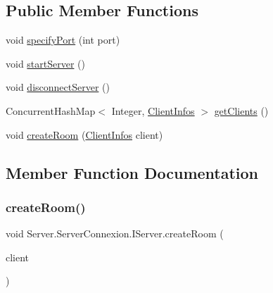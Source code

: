 \subsection*{Public Member Functions}
\begin{DoxyCompactItemize}
\item 
void \mbox{\hyperlink{interfaceServer_1_1ServerConnexion_1_1IServer_a708adb2b4f2312b4319496d92357bd0e}{specify\+Port}} (int port)
\item 
void \mbox{\hyperlink{interfaceServer_1_1ServerConnexion_1_1IServer_a13c33c54ae46ee73c99ae8b9a70b9397}{start\+Server}} ()
\item 
void \mbox{\hyperlink{interfaceServer_1_1ServerConnexion_1_1IServer_abad216cef2fde213cfe1e69f2be7b496}{disconnect\+Server}} ()
\item 
Concurrent\+Hash\+Map$<$ Integer, \mbox{\hyperlink{classServer_1_1ServerConnexion_1_1ClientInfos}{Client\+Infos}} $>$ \mbox{\hyperlink{interfaceServer_1_1ServerConnexion_1_1IServer_a0b71f139e86b01657d54b4be165d0c8d}{get\+Clients}} ()
\item 
void \mbox{\hyperlink{interfaceServer_1_1ServerConnexion_1_1IServer_a3b0485118add6720d6526c59605404d2}{create\+Room}} (\mbox{\hyperlink{classServer_1_1ServerConnexion_1_1ClientInfos}{Client\+Infos}} client)
\end{DoxyCompactItemize}


\subsection{Member Function Documentation}
\mbox{\label{interfaceServer_1_1ServerConnexion_1_1IServer_a3b0485118add6720d6526c59605404d2}} 
\subsubsection{\texorpdfstring{create\+Room()}{createRoom()}}
{\footnotesize\ttfamily void Server.\+Server\+Connexion.\+I\+Server.\+create\+Room (\begin{DoxyParamCaption}\item[{\mbox{\hyperlink{classServer_1_1ServerConnexion_1_1ClientInfos}{Client\+Infos}}}]{client }\end{DoxyParamCaption})}



